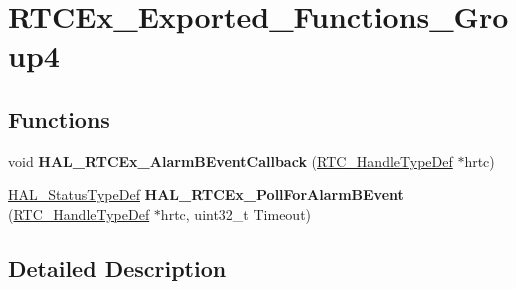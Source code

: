 \hypertarget{group___r_t_c_ex___exported___functions___group4}{}\section{R\+T\+C\+Ex\+\_\+\+Exported\+\_\+\+Functions\+\_\+\+Group4}
\label{group___r_t_c_ex___exported___functions___group4}
\subsection*{Functions}
\begin{DoxyCompactItemize}
\item 
void {\bfseries H\+A\+L\+\_\+\+R\+T\+C\+Ex\+\_\+\+Alarm\+B\+Event\+Callback} (\hyperlink{struct_r_t_c___handle_type_def}{R\+T\+C\+\_\+\+Handle\+Type\+Def} $\ast$hrtc)\hypertarget{group___r_t_c_ex___exported___functions___group4_ga9da295aecbc4566dabc161437d1b95f2}{}\label{group___r_t_c_ex___exported___functions___group4_ga9da295aecbc4566dabc161437d1b95f2}

\item 
\hyperlink{stm32f4xx__hal__def_8h_a63c0679d1cb8b8c684fbb0632743478f}{H\+A\+L\+\_\+\+Status\+Type\+Def} {\bfseries H\+A\+L\+\_\+\+R\+T\+C\+Ex\+\_\+\+Poll\+For\+Alarm\+B\+Event} (\hyperlink{struct_r_t_c___handle_type_def}{R\+T\+C\+\_\+\+Handle\+Type\+Def} $\ast$hrtc, uint32\+\_\+t Timeout)\hypertarget{group___r_t_c_ex___exported___functions___group4_gaec42cd894d63744c4914ec6a65510cae}{}\label{group___r_t_c_ex___exported___functions___group4_gaec42cd894d63744c4914ec6a65510cae}

\end{DoxyCompactItemize}


\subsection{Detailed Description}
